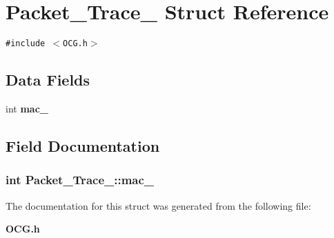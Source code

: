 \section{Packet\_\-Trace\_\- Struct Reference}
\label{structPacket__Trace__}
{\tt \#include $<$OCG.h$>$}

\subsection*{Data Fields}
\begin{CompactItemize}
\item 
int {\bf mac\_\-}
\end{CompactItemize}


\subsection{Field Documentation}
\subsubsection[{mac\_\-}]{\setlength{\rightskip}{0pt plus 5cm}int {\bf Packet\_\-Trace\_\-::mac\_\-}}\label{structPacket__Trace___c34d818db71259f304a679a96498f603}




The documentation for this struct was generated from the following file:\begin{CompactItemize}
\item 
{\bf OCG.h}\end{CompactItemize}

